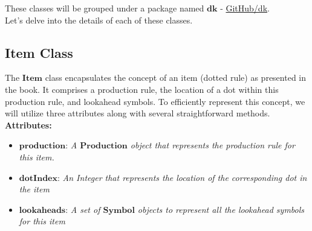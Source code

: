 These classes will be grouped under a package named \(\boldsymbol{dk}\) - \href{https://github.com/fyfsb/dcfg/tree/main/src/main/java/dk}{GitHub/dk}.\\

Let’s delve into the details of each of these classes.

\subsection{Item Class}

The \(\boldsymbol{Item}\) class encapsulates the concept of an item (dotted rule) as presented in the book. It comprises a production rule, the location of a dot within this production rule, and lookahead symbols. To efficiently represent this concept, we will utilize three attributes along with several straightforward methods.\\

\textbf{Attributes:}
\begin{itemize}
    \item \(\boldsymbol{production}\): \textit{A \(\boldsymbol{Production}\) object that represents the production rule for this item.}
    \item \(\boldsymbol{dotIndex}\): \textit{An Integer that represents the location of the corresponding dot in the item}
    \item \(\boldsymbol{lookaheads}\): \textit{A set of \(\boldsymbol{Symbol}\) objects to represent all the lookahead symbols for this item}
\end{itemize}

